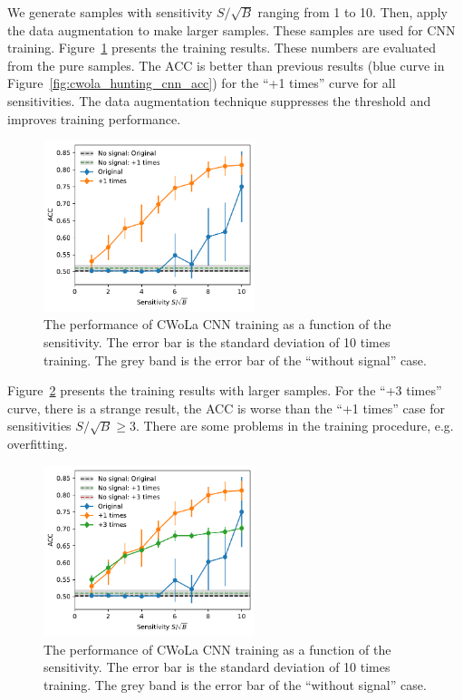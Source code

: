 \documentclass[12pt]{article}
\begin{document}
		We generate samples with sensitivity $S / \sqrt{B}$ ranging from 1 to 10. Then, apply the data augmentation to make larger samples. These samples are used for CNN training. Figure~\ref{fig:cwola_hunting_cnn_acc_data_augmetation} presents the training results. These numbers are evaluated from the pure samples. The ACC is better than previous results (blue curve in Figure~\ref{fig:cwola_hunting_cnn_acc}) for the ``+1 times'' curve for all sensitivities. The data augmentation technique suppresses the threshold and improves training performance.

		\begin{figure}[htpb]
			\centering
			\includegraphics[width=0.55\textwidth]{HVmodel_CWoLa_CNN_aug_1.pdf}
			\caption{The performance of CWoLa CNN training as a function of the sensitivity. The error bar is the standard deviation of 10 times training. The grey band is the error bar of the ``without signal'' case.}
			\label{fig:cwola_hunting_cnn_acc_data_augmetation}
		\end{figure}

		 Figure~\ref{fig:cwola_hunting_cnn_acc_data_augmetation_3_times} presents the training results with larger samples. For the ``+3 times'' curve, there is a strange result, the ACC is worse than the ``+1 times'' case for sensitivities $S / \sqrt{B} \ge 3$. There are some problems in the training procedure, e.g. overfitting.
		\begin{figure}[htpb]
			\centering
			\includegraphics[width=0.55\textwidth]{HVmodel_CWoLa_CNN_aug_1_3.pdf}
			\caption{The performance of CWoLa CNN training as a function of the sensitivity. The error bar is the standard deviation of 10 times training. The grey band is the error bar of the ``without signal'' case.}
			\label{fig:cwola_hunting_cnn_acc_data_augmetation_3_times}
		\end{figure}
\end{document}

